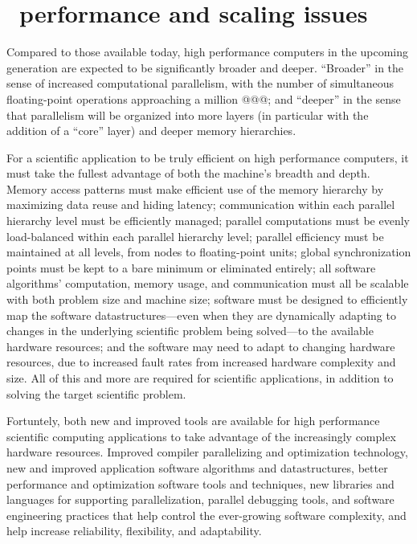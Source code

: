 \documentclass{article}
\begin{document}

\section{\enzo\ performance and scaling issues}

Compared to those available today, high performance computers in the
upcoming generation are expected to be significantly broader and
deeper.  ``Broader'' in the sense of increased computational
parallelism, with the number of simultaneous floating-point operations
approaching a million @@@; and ``deeper'' in the sense that
parallelism will be organized into more layers (in particular with the
addition of a ``core'' layer) and deeper memory hierarchies.

For a scientific application to be truly efficient on high performance
computers, it must take the fullest advantage of both the machine's
breadth and depth.  Memory access patterns must make efficient use of
the memory hierarchy by maximizing data reuse and hiding latency;
communication within each parallel hierarchy level must be efficiently
managed; parallel computations must be evenly load-balanced within
each parallel hierarchy level; parallel efficiency must be maintained
at all levels, from nodes to floating-point units; global
synchronization points must be kept to a bare minimum or eliminated
entirely; all software algorithms' computation, memory usage, and
communication must all be scalable with both problem size and machine
size; software must be designed to efficiently map the software
datastructures---even when they are dynamically adapting to changes in
the underlying scientific problem being solved---to the available
hardware resources; and the software may need to adapt to changing
hardware resources, due to increased fault rates from increased
hardware complexity and size.  All of this and more are required for
scientific applications, in addition to solving the target scientific
problem.

Fortuntely, both new and improved tools are available for high
performance scientific computing applications to take advantage of the
increasingly complex hardware resources.  Improved compiler
parallelizing and optimization technology, new and improved
application software algorithms and datastructures, better performance
and optimization software tools and techniques, new libraries and
languages for supporting parallelization, parallel debugging tools,
and software engineering practices that help control the ever-growing
software complexity, and help increase reliability, flexibility, and
adaptability.
\end{document}
